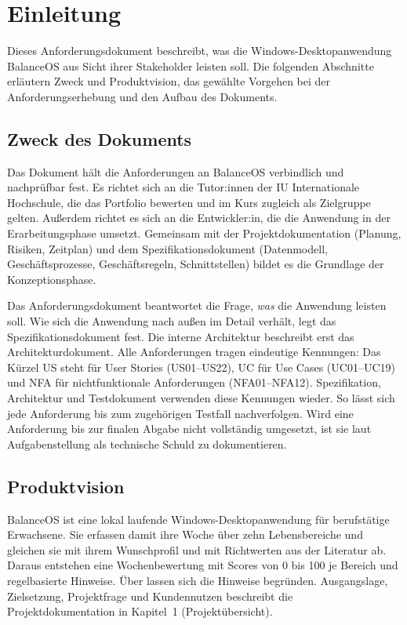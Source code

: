 \section{Einleitung}
Dieses Anforderungsdokument beschreibt, was die Windows-Desktopanwendung BalanceOS aus Sicht ihrer Stakeholder leisten soll. Die folgenden Abschnitte erläutern Zweck und Produktvision, das gewählte Vorgehen bei der Anforderungserhebung und den Aufbau des Dokuments.

\subsection{Zweck des Dokuments}
Das Dokument hält die Anforderungen an BalanceOS verbindlich und nachprüfbar fest. Es richtet sich an die Tutor:innen der IU Internationale Hochschule, die das Portfolio bewerten und im Kurs zugleich als Zielgruppe gelten. Außerdem richtet es sich an die Entwickler:in, die die Anwendung in der Erarbeitungsphase umsetzt. Gemeinsam mit der Projektdokumentation (Planung, Risiken, Zeitplan) und dem Spezifikationsdokument (Datenmodell, Geschäftsprozesse, Geschäftsregeln, Schnittstellen) bildet es die Grundlage der Konzeptionsphase.

Das Anforderungsdokument beantwortet die Frage, \emph{was} die Anwendung leisten soll. Wie sich die Anwendung nach außen im Detail verhält, legt das Spezifikationsdokument fest. Die interne Architektur beschreibt erst das Architekturdokument. Alle Anforderungen tragen eindeutige Kennungen: Das Kürzel \acs{US} steht für User Stories (US01--US22), \acs{UC} für Use Cases (UC01--UC19) und \acs{NFA} für nichtfunktionale Anforderungen (NFA01--NFA12). Spezifikation, Architektur und Testdokument verwenden diese Kennungen wieder. So lässt sich jede Anforderung bis zum zugehörigen Testfall nachverfolgen. Wird eine Anforderung bis zur finalen Abgabe nicht vollständig umgesetzt, ist sie laut Aufgabenstellung als technische Schuld zu dokumentieren.

\subsection{Produktvision}
BalanceOS ist eine lokal laufende Windows-Desktopanwendung für berufstätige Erwachsene. Sie erfassen damit ihre Woche über zehn Lebensbereiche und gleichen sie mit ihrem Wunschprofil und mit Richtwerten aus der Literatur ab. Daraus entstehen eine Wochenbewertung mit Scores von 0 bis 100 je Bereich und regelbasierte Hinweise. Über  lassen sich die Hinweise begründen. Ausgangslage, Zielsetzung, Projektfrage und Kundennutzen beschreibt die Projektdokumentation in Kapitel~1 (Projektübersicht).

